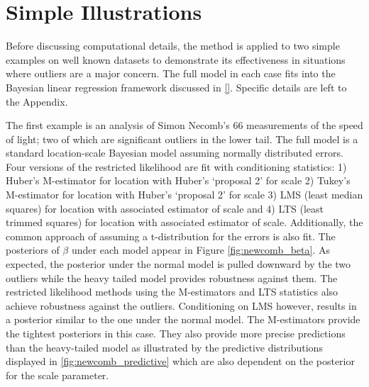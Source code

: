 \documentclass[11pt]{article}
\begin{document}
\section{Simple Illustrations}
\label{illustrations}
Before discussing computational details, the method is applied to two simple examples on well known datasets to demonstrate its effectiveness in situations where outliers are a major concern. The full model in each case fits into the Bayesian linear regression framework discussed in \ref{}. Specific details are left to the Appendix. 

The first example is an analysis of Simon Necomb's 66 measurements of the speed of light; two of which are significant outliers in the lower tail. The full model is a standard location-scale Bayesian model assuming normally distributed errors. Four versions of the restricted likelihood are fit with conditioning statistics: 1) Huber's M-estimator for location with Huber's `proposal 2'  for scale 2)   Tukey's M-estimator for location with Huber's `proposal 2'  for scale 3) LMS (least median squares) for location with associated estimator of scale and 4) LTS (least trimmed squares)  for location with associated estimator of scale. Additionally, the common approach of assuming a t-distribution for the errors is also fit. The posteriors of $\beta$ under each model appear in Figure \ref{fig:newcomb_beta}. As expected, the posterior under the normal model is pulled downward by the two outliers while the heavy tailed model provides robustness against them. The restricted likelihood methods using the M-estimators and LTS statistics also achieve robustness against the outliers. Conditioning on LMS however, results in a posterior similar to the one under the normal model. The M-estimators provide the tightest posteriors in this case. They also provide more precise predictions than the heavy-tailed model as illustrated by the predictive distributions displayed in \ref{fig:newcomb_predictive} which are also dependent on the posterior for the scale parameter.
\end{document}
